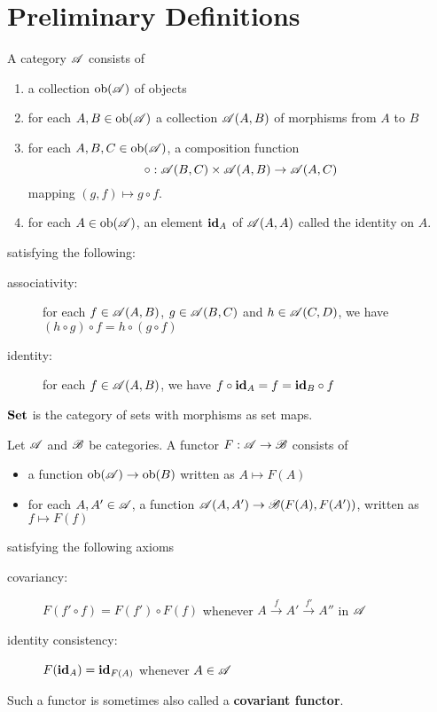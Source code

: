 \section{Preliminary Definitions}

\begin{definition}[Category]
    A category $\mathscr{A}$ consists of 
    \begin{enumerate}
        \item a collection $\operatorname{ob}(\mathscr{A})$ of objects 
        \item for each $A,B\in\operatorname{ob}(\mathscr{A})$ a collection $\mathscr{A}(A,B)$ of morphisms from $A$ to $B$ 
        \item for each $A,B,C\in\operatorname{ob}(\mathscr{A})$, a composition function 
        \begin{equation*}
            \circ: \mathscr{A}(B,C)\times\mathscr{A}(A,B)\to\mathscr{A}(A,C)
        \end{equation*}
        mapping $(g,f)\mapsto g\circ f$.
        \item for each $A\in\operatorname{ob}(\mathscr{A})$, an element $\mathbf{id}_A$ of $\mathscr{A}(A,A)$ called the identity on $A$.
    \end{enumerate}

    \noindent satisfying the following: 
    \begin{description}
        \item[associativity:] for each $f\in\mathscr{A}(A,B)$, $g\in\mathscr{A}(B,C)$ and $h\in\mathscr{A}(C,D)$, we have $(h\circ g)\circ f = h\circ (g\circ f)$
        \item[identity:] for each $f\in\mathscr{A}(A,B)$, we have $f\circ\mathbf{id}_A = f = \mathbf{id}_B\circ f$
    \end{description}
\end{definition}

$\mathbf{Set}$ is the category of sets with morphisms as set maps.


\begin{definition}[Functor]
    Let $\mathscr{A}$ and $\mathscr{B}$ be categories. A functor $F:\mathscr{A}\to\mathscr{B}$ consists of 
    \begin{itemize}
        \item a function $\operatorname{ob}(\mathscr{A})\to\operatorname{ob}(B)$ written as $A\mapsto F(A)$
        \item for each $A,A'\in\mathscr{A}$, a function $\mathscr{A}(A,A')\to\mathscr{B}(F(A),F(A'))$, written as $f\mapsto F(f)$
    \end{itemize}

    \noindent satisfying the following axioms
    \begin{description}
        \item[covariancy:] $F(f'\circ f) = F(f')\circ F(f)$ whenever $A\stackrel{f}{\longrightarrow} A'\stackrel{f'}{\longrightarrow}A''$ in $\mathscr{A}$ 
        \item[identity consistency:] $F(\mathbf{id}_A) = \mathbf{id}_{F(A)}$ whenever $A\in\mathscr{A}$ 
    \end{description}

    Such a functor is sometimes also called a \textbf{covariant functor}.
\end{definition}

